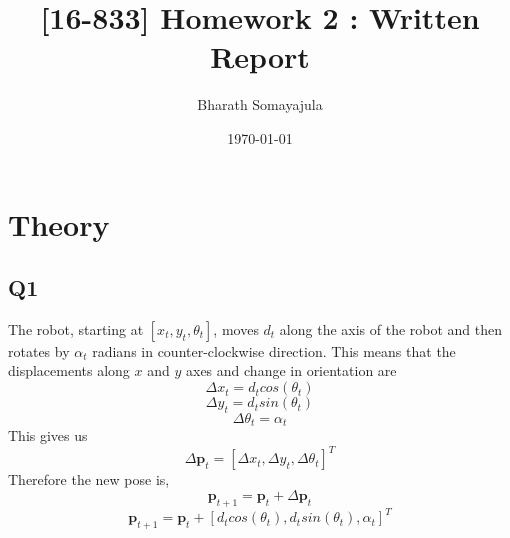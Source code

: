 \documentclass[12pt, a4paper]{article}
\title{[16-833] Homework 2 : Written Report}
\author{Bharath Somayajula}
\date{\today}
\begin{document}
\maketitle

\tableofcontents
\section{Theory}
\subsection{Q1}
The robot, starting at $\left[x_t, y_t, \theta_t\right]$, moves $d_t$ along the axis of the robot and then rotates by $\alpha_t$ radians in counter-clockwise direction. This means that the displacements along $x$ and $y$ axes and change in orientation are
\[\Delta x_{t} = d_tcos(\theta_t)\]
\[\Delta y_{t} = d_tsin(\theta_t)\]
\[\Delta \theta_t = \alpha_t\]
This gives us
\[\Delta \mathbf{p}_t = [\Delta x_{t}, \Delta y_{t}, \Delta \theta_t]^T\]
Therefore the new pose is,
\[\mathbf{p}_{t+1} = \mathbf{p}_{t} + \Delta \mathbf{p}_t\] 
\[\mathbf{p}_{t+1} = \mathbf{p}_{t} + \left[d_tcos(\theta_t), d_tsin(\theta_t), \alpha_t\right]^T\] 
\end{document}
